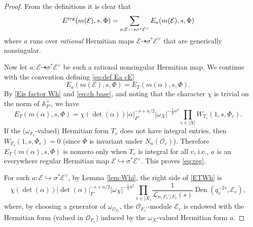\documentclass[reqno]{amsart}
\numberwithin{equation}{section}
\newcommand{\BA}{\ensuremath{\mathbb{A}}\xspace}
\newcommand{\sL}{\ensuremath{\mathscr{L}}\xspace}
\newcommand{\wh}[1]{\widehat{#1}}
\newcommand{\inj}{\hookrightarrow}
\DeclareMathOperator{\Herm}{Herm}
\DeclareMathOperator{\Den}{Den}
\newcommand{\isom}{\stackrel{\sim}{\to}}
\renewcommand\a\alpha
\newcommand{\s}{\sigma}
\renewcommand{\t}{\tau}
\newcommand{\om}{\omega}
\newcommand\cE{\mathcal{E}}
\newcommand\cO{\mathcal{O}}
\theoremstyle{remark}
\numberwithin{equation}{section}
\begin{document}
\begin{proof} 
From the definitions it is clear that
\begin{equation*}
E^{\rm reg}(m(\cE),s,\Phi)=\sum_{a:\cE\dashrightarrow\s^{*}\cE^{\vee}}E_{a}(m(\cE),s,\Phi)
\end{equation*}
where $a$ runs over {\em rational} Hermitian maps $\cE\dashrightarrow \s^* \cE^{\vee}$ that are generically nonsingular.


Now let $a:\cE\dashrightarrow\s^{*}\cE^{\vee}$ be such a rational nonsingular Hermitian map. We continue with the convention defining  \eqref{eq:def Ea cE} 
\begin{equation}\label{EaET}
E_{a}(m(\cE),s,\Phi)=E_{T}(m(\a), s,\Phi).
\end{equation}
By \eqref{Eis factor Wh} and \eqref{eq:ch base}, and noting that the character $\chi$ is trivial on the norm of $\BA_{F'}^\times$, we have 
\begin{equation}\label{ETWh}
E_{T}(m(\alpha),s,\Phi)=\chi(\det(\alpha))|\alpha|_{F'}^{-s+n/2} |\om_{X}|^{-\frac{1}{2}n^2} \prod_{v\in |X|}W_{T_{v}}(1,s,\Phi_{v}).
\end{equation}
If the ($\omega_{F_v}$-valued) Hermitian form $T_{v}$ does not have integral entries, then $W_{T_{v}}(1,s,\Phi_{v})=0$ (since $\Phi$ is invariant under $N_{n}(\cO_{v})$). Therefore $E_{T}(m(\alpha),s,\Phi)$ is nonzero only when  $T_{v}$ is integral for all $v$, i.e., $a$ is an everywhere regular Hermitian map $\cE\inj\s^{*}\cE^{\vee}$. This proves \eqref{eq:reg}.

For such $a: \cE\inj\s^{*}\cE^{\vee}$, by Lemma \ref{lem:Whi}, the right side of \eqref{ETWh} is
\begin{equation}\label{WhDen}
\chi(\det(\alpha))|\det (\alpha)|_{F'}^{-s+n/2} |\om_{X}|^{-\frac{1}{2}n^2} \prod_{v\in |X|}\frac{1}{\sL_{n, F_v'/F_v}(s) }  \Den(q_v^{-2s},  \cE_{v}),
\end{equation}
where, by choosing a generator of $\om_{\cO_{F_v}}$, the $\cO_{F_v'}$-module $\cE_v$ is endowed with the Hermitian form (valued in $\cO_{F_v}$) induced by the $\om_{X}$-valued Hermitian form $a$.


\end{proof}
\end{document}
